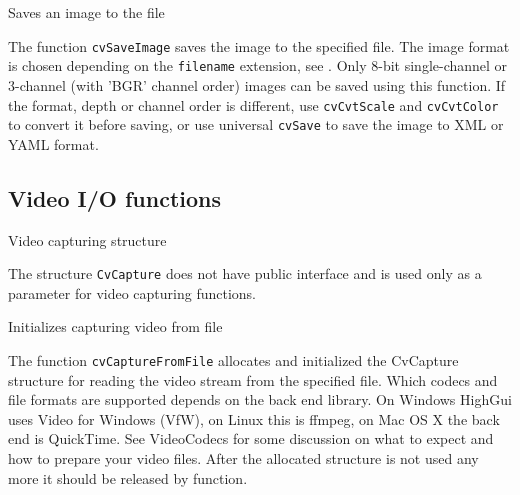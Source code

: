 
Saves an image to the file


\begin{description}
\end{description}

The function \texttt{cvSaveImage} saves the image to the specified file. The image format is chosen depending on the \texttt{filename} extension, see . Only 8-bit single-channel or 3-channel (with 'BGR' channel order) images can be saved using this function. If the format, depth or channel order is different, use \texttt{cvCvtScale} and \texttt{cvCvtColor} to convert it before saving, or use universal \texttt{cvSave} to save the image to XML or YAML format.

\subsection{Video I/O functions}


Video capturing structure


The structure \texttt{CvCapture} does not have public interface and is used only as a parameter for video capturing functions.


Initializes capturing video from file


\begin{description}
\end{description}

The function \texttt{cvCaptureFromFile} allocates and initialized the CvCapture structure for reading the video stream from the specified file. Which codecs and file formats are supported depends on the back end library. On Windows HighGui uses Video for Windows (VfW), on Linux this is ffmpeg, on Mac OS X the back end is QuickTime. See VideoCodecs for some discussion on what to expect and how to prepare your video files.
\newline
\newline
After the allocated structure is not used any more it should be released by  function.

